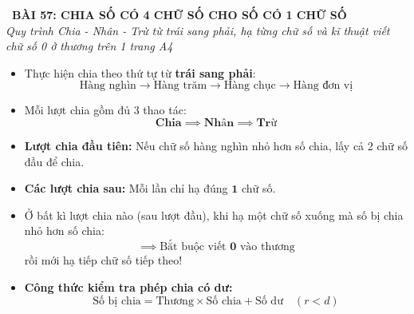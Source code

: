 \documentclass[11pt,a4paper]{article}
\begin{document}
\begin{tcolorbox}[
  enhanced,
  colback=white,
  colframe=primary,
  arc=3mm,
  boxrule=1.2pt,
  left=4mm, right=4mm, top=2.5mm, bottom=2.5mm,
  drop shadow=black!10!white
]
  \centering
  {\Large\bfseries\color{primary}\faBookmark\ BÀI 57: CHIA SỐ CÓ 4 CHỮ SỐ CHO SỐ CÓ 1 CHỮ SỐ}\\[1.5mm]
  {\small\itshape\color{black!75}Quy trình Chia - Nhân - Trừ từ trái sang phải, hạ từng chữ số và kĩ thuật viết chữ số 0 ở thương trên 1 trang A4}
\end{tcolorbox}

\vspace{-2mm}


\noindent
\begin{minipage}[t]{0.49\textwidth}\vspace{0pt}
\begin{tcolorbox}[
  enhanced,
  colback=blue!4!white,
  colframe=blue!75!black,
  arc=2mm, boxrule=0.8pt,
  left=2mm, right=2mm, top=1.8mm, bottom=1.8mm,
  title={\footnotesize\bfseries\color{white}\faCalculator\ 1. Quy trình Đặt tính và Chia}
]
{\footnotesize
\begin{itemize}\setlength{\itemsep}{1.5pt}\setlength{\leftskip}{-2.5mm}
  \item Thực hiện chia theo thứ tự từ \textbf{trái sang phải}:
  $$\text{Hàng nghìn} \to \text{Hàng trăm} \to \text{Hàng chục} \to \text{Hàng đơn vị}$$
  \item Mỗi lượt chia gồm đủ 3 thao tác:
  $$\mathbf{\text{Chia}} \implies \mathbf{\text{Nhân}} \implies \mathbf{\text{Trừ}}$$
  \item \textbf{Lượt chia đầu tiên:} Nếu chữ số hàng nghìn nhỏ hơn số chia, lấy cả 2 chữ số đầu để chia.
  \item \textbf{Các lượt chia sau:} Mỗi lần chỉ hạ đúng $\mathbf{1}$ chữ số.
\end{itemize}
}
\end{tcolorbox}
\end{minipage}
\hfill
\begin{minipage}[t]{0.49\textwidth}\vspace{0pt}
\begin{tcolorbox}[
  enhanced,
  colback=teal!4!white,
  colframe=teal!75!black,
  arc=2mm, boxrule=0.8pt,
  left=2mm, right=2mm, top=1.8mm, bottom=1.8mm,
  title={\footnotesize\bfseries\color{white}\faKey\ 2. Xử lý chữ số 0 ở thương}
]
{\footnotesize
\begin{itemize}\setlength{\itemsep}{1.5pt}\setlength{\leftskip}{-2.5mm}
  \item Ở bất kì lượt chia nào (sau lượt đầu), khi hạ một chữ số xuống mà số bị chia nhỏ hơn số chia:
  $$\implies \text{Bắt buộc viết } \mathbf{0} \text{ vào thương}$$
  rồi mới hạ tiếp chữ số tiếp theo!
  \item \textbf{Công thức kiểm tra phép chia có dư:}
  $$\text{Số bị chia} = \text{Thương} \times \text{Số chia} + \text{Số dư} \quad (r < d)$$
\end{itemize}
}
\end{tcolorbox}
\end{minipage}
\end{document}
